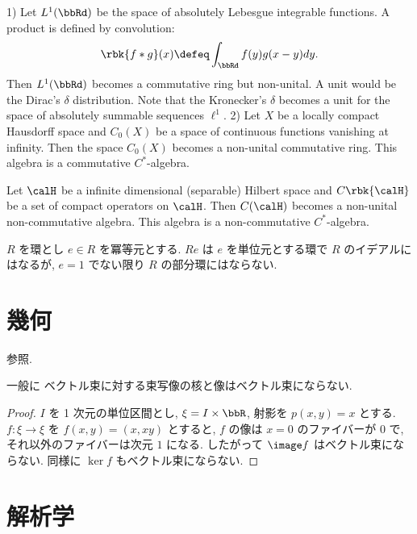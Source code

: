 \documentclass[openany, a4paper, oneside]{jsbook}
\begin{document}
\begin{ex}
 1) Let $L^1(\bbRd)$ be the space of absolutely Lebesgue integrable functions.
    A product is defined by convolution:
    \begin{align}
     \rbk{f * g} (x)
     \defeq
     \int_{\bbRd} f(y) g(x - y) dy.
    \end{align}
    Then $L^1(\bbRd)$ becomes a commutative ring but non-unital.
    A unit would be the Dirac's $\delta$ distribution.
    Note that the Kronecker's $\delta$ becomes a unit for the space of absolutely summable sequences $\ell^1$.
 2) Let $X$ be a locally compact Hausdorff space and $C_0(X)$ be a space of continuous functions vanishing at infinity.
    Then the space $C_0(X)$ becomes a non-unital commutative ring.
    This algebra is a commutative $C^*$-algebra.
\end{ex}
\begin{ex}
 Let $\calH$ be a infinite dimensional (separable) Hilbert space and $C \rbk{\calH}$ be a set of compact operators on $\calH$.
 Then $C (\calH)$ becomes a non-unital non-commutative algebra.
 This algebra is a non-commutative $C^*$-algebra.
\end{ex}
\begin{ex}[冪等元が生成するは元の環の部分環にならない]
 $R$ を環とし $e \in R$ を冪等元とする.
 $Re$ は $e$ を単位元とする環で $R$ のイデアルにはなるが, $e = 1$ でない限り $R$ の部分環にはならない.
\end{ex}
\chapter{幾何}

\begin{ex}
\cite{CalabiRosenlicht1} 参照.
\end{ex}

\begin{ex}
一般に ベクトル束に対する束写像の核と像はベクトル束にならない.
\end{ex}
\begin{proof}
$I$ を 1 次元の単位区間とし, $\xi = I \times \bbR$, 射影を $p(x,y) = x$ とする.
$f \colon \xi \to \xi$ を $f(x,y) = (x, xy)$ とすると,
$f$ の像は $x = 0$ のファイバーが $0$ で, それ以外のファイバーは次元 $1$ になる.
したがって $\image f$ はベクトル束にならない.
同様に $\ker f$ もベクトル束にならない.
\end{proof}
\chapter{解析学}
\end{document}
